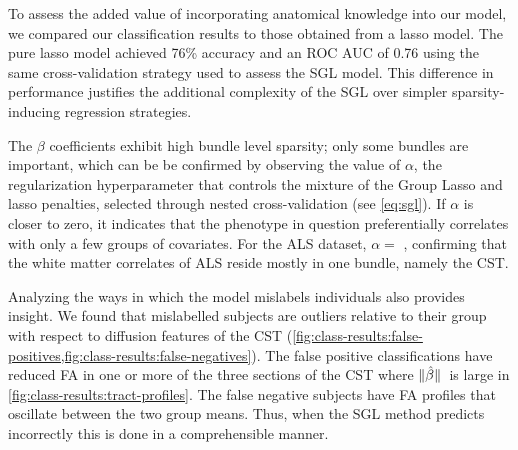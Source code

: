 \documentclass[10pt,letterpaper]{article}
\begin{document}
To assess the added value of incorporating anatomical knowledge into our
model, we compared our classification results to those obtained from a lasso
model. The pure lasso model achieved 76\% accuracy and an ROC AUC of 0.76
using the same cross-validation strategy used to assess the SGL model. This
difference in performance justifies the additional complexity of the SGL over
simpler sparsity-inducing regression strategies.

The $\beta$ coefficients exhibit high bundle level sparsity; only some
bundles are important, which can be be confirmed by observing the value of
$\alpha$, the regularization hyperparameter that controls the mixture of the
Group Lasso and lasso penalties, selected through nested cross-validation
(see \cref{eq:sgl}).
If $\alpha$ is closer to zero, it indicates that the phenotype in question
preferentially correlates with only a few groups of covariates. For the ALS
dataset, $\alpha = $ \alsLRatio, confirming that the white matter correlates
of ALS reside mostly in one bundle, namely the CST.

Analyzing the ways in which the model mislabels individuals also provides
insight. We found that mislabelled subjects are outliers relative to their
group with respect to diffusion features of the CST
(\cref{fig:class-results:false-positives,fig:class-results:false-negatives}).
The false positive classifications have reduced FA in one or more of the
three sections of the CST where $\norm*{\hat{\beta}}$ is large in
\cref{fig:class-results:tract-profiles}. The false negative subjects have FA
profiles that oscillate between the two group means. Thus, when the SGL
method predicts incorrectly this is done in a comprehensible manner.
\end{document}
